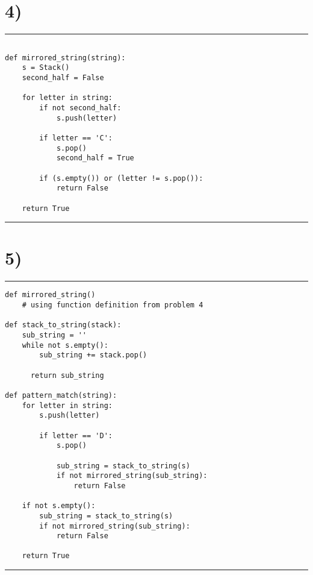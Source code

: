 \documentclass[a4paper,11pt]{article}
\begin{document}

\section*{4)} 

\noindent\rule{\linewidth}{0.1pt}
\begin{verbatim}

def mirrored_string(string):
    s = Stack()
    second_half = False
    
    for letter in string:
        if not second_half:
            s.push(letter)
        
        if letter == 'C':
            s.pop()
            second_half = True
           
        if (s.empty()) or (letter != s.pop()):
            return False 
            
    return True
\end{verbatim}
\noindent\rule{\linewidth}{0.1pt}


\section*{5)}

\noindent\rule{\linewidth}{0.1pt}
\begin{verbatim}
def mirrored_string()
    # using function definition from problem 4
    
def stack_to_string(stack):
    sub_string = ''
    while not s.empty():
        sub_string += stack.pop()
        
      return sub_string
    
def pattern_match(string):
    for letter in string:
        s.push(letter)
    
        if letter == 'D':
            s.pop()
        
            sub_string = stack_to_string(s)
            if not mirrored_string(sub_string):
                return False
                
    if not s.empty():
        sub_string = stack_to_string(s)
        if not mirrored_string(sub_string):
            return False
                
    return True
\end{verbatim}
\noindent\rule{\linewidth}{0.1pt}

\end{document}
